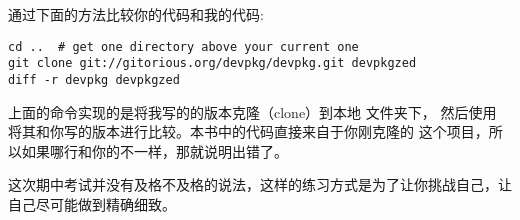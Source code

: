 通过下面的方法比较你的代码和我的代码:

\begin{lstlisting}
cd ..  # get one directory above your current one
git clone git://gitorious.org/devpkg/devpkg.git devpkgzed
diff -r devpkg devpkgzed
\end{lstlisting}

上面的命令实现的是将我写的的版本克隆（clone）到本地  文件夹下，
然后使用  将其和你写的版本进行比较。本书中的代码直接来自于你刚克隆的
这个项目，所以如果哪行和你的不一样，那就说明出错了。

这次期中考试并没有及格不及格的说法，这样的练习方式是为了让你挑战自己，让自己尽可能做到精确细致。

